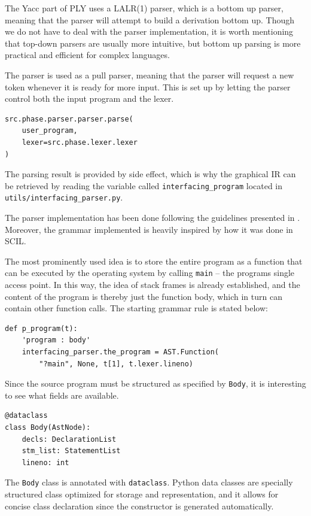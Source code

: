 The Yacc part of PLY uses a LALR(1) parser, which is a bottom up parser, meaning that the parser will attempt to build a derivation bottom up. Though we do not have to deal with the parser implementation, it is worth mentioning that top-down parsers are usually more intuitive, but bottom up parsing is more practical and efficient for complex languages. 

The parser is used as a pull parser, meaning that the parser will request a new token whenever it is ready for more input. This is set up by letting the parser control both the input program and the lexer. 

\begin{verbatim}
src.phase.parser.parser.parse(
    user_program,
    lexer=src.phase.lexer.lexer
)
\end{verbatim}

The parsing result is provided by side effect, which is why the graphical IR can be retrieved by reading the variable called \texttt{interfacing\_program} located in \texttt{utils/\-interfacing\_parser.py}. 

The parser implementation has been done following the guidelines presented in \cite[section 6][]{ply}. Moreover, the grammar implemented is heavily inspired by how it was done in SCIL. 

The most prominently used idea is to store the entire program as a function that can be executed by the operating system by calling \texttt{main} -- the programs single access point. In this way, the idea of stack frames is already established, and the content of the program is thereby just the function body, which in turn can contain other function calls. The starting grammar rule is stated below:

\begin{verbatim}
def p_program(t):
    'program : body'
    interfacing_parser.the_program = AST.Function(
        "?main", None, t[1], t.lexer.lineno)
\end{verbatim}

Since the source program must be structured as specified by \texttt{Body}, it is interesting to see what fields are available.

\begin{verbatim}
@dataclass
class Body(AstNode):
    decls: DeclarationList
    stm_list: StatementList
    lineno: int    
\end{verbatim}

The \texttt{Body} class is annotated with \texttt{dataclass}. Python data classes are specially structured class optimized for storage and representation, and it allows for concise class declaration since the constructor is generated automatically.


